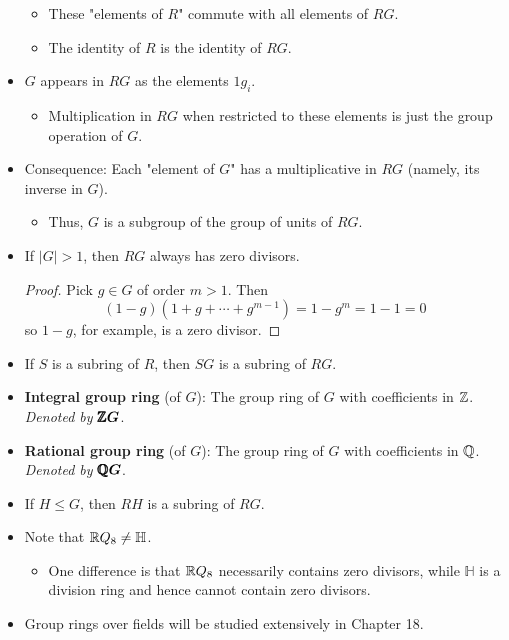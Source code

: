 \documentclass[../notes.tex]{subfiles}
\begin{document}
\begin{itemize}
\begin{itemize}
        \item These "elements of $R$" commute with all elements of $RG$.
        \item The identity of $R$ is the identity of $RG$.
    \end{itemize}
    \item $G$ appears in $RG$ as the elements $1g_i$.
    \begin{itemize}
        \item Multiplication in $RG$ when restricted to these elements is just the group operation of $G$.
    \end{itemize}
    \item Consequence: Each "element of $G$" has a multiplicative in $RG$ (namely, its inverse in $G$).
    \begin{itemize}
        \item Thus, $G$ is a subgroup of the group of units of $RG$.
    \end{itemize}
    \item If $|G|>1$, then $RG$ always has zero divisors.
    \begin{proof}
        Pick $g\in G$ of order $m>1$. Then
        \begin{equation*}
            (1-g)(1+g+\cdots+g^{m-1}) = 1-g^m
            = 1-1
            = 0
        \end{equation*}
        so $1-g$, for example, is a zero divisor.
    \end{proof}
    \item If $S$ is a subring of $R$, then $SG$ is a subring of $RG$.
    \item \textbf{Integral group ring} (of $G$): The group ring of $G$ with coefficients in $\mathbb{Z}$. \emph{Denoted by} $\bm{\pmb{\mathbb{Z}}G}$.
    \item \textbf{Rational group ring} (of $G$): The group ring of $G$ with coefficients in $\mathbb{Q}$. \emph{Denoted by} $\bm{\pmb{\mathbb{Q}}G}$.
    \item If $H\leq G$, then $RH$ is a subring of $RG$.
    \item Note that $\mathbb{R} Q_8\neq\mathbb{H}$.
    \begin{itemize}
        \item One difference is that $\mathbb{R} Q_8$ necessarily contains zero divisors, while $\mathbb{H}$ is a division ring and hence cannot contain zero divisors.
    \end{itemize}
    \item Group rings over fields will be studied extensively in Chapter 18.
\end{itemize}
\end{document}

